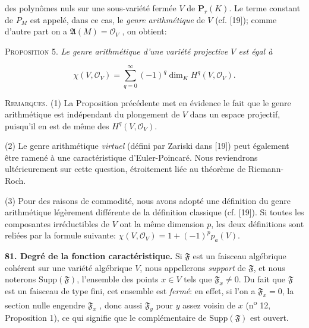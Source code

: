 %
%
%
des polynômes nuls sur une sous-variété fermée $V$ de $\mathbf{P}_r(K)$. Le terme constant de $P_M$ est appelé, dans ce cas, le \textit{genre arithmétique} de $V$ (cf. [19]); comme d'autre part on a $\mathfrak{A}(M) = \mathcal{O}_V$ , on obtient:

\textsc{Proposition} 5. \textit{Le genre arithmétique d'une variété projective $V$ est égal à}

\begin{equation*}
\chi(V, \mathcal{O}_V) = \sum_{q=0}^{\infty} (-1)^q \dim_K H^q(V, \mathcal{O}_V).
\end{equation*}

\textsc{Remarques}. (1) La Proposition précédente met en évidence le fait que le genre arithmétique est indépendant du plongement de $V$ dans un espace projectif, puisqu'il en est de même des $H^q(V, \mathcal{O}_V)$.

(2) Le genre arithmétique \textit{virtuel} (défini par Zariski dans [19]) peut également être ramené à une caractéristique d'Euler-Poincaré. Nous reviendrons ultérieurement sur cette question, étroitement liée au théorème de Riemann-Roch.

(3) Pour des raisons de commodité, nous avons adopté une définition du genre arithmétique légèrement différente de la définition classique (cf. [19]). Si toutes les composantes irréductibles de $V$ ont la même dimension $p$, les deux définitions sont reliées par la formule suivante: $\chi(V, \mathcal{O}_V) = 1 + (-1)^p p_a(V)$.

\textbf{81. Degré de la fonction caractéristique.} Si $\mathfrak{F}$ est un faisceau algébrique cohérent sur une variété algébrique $V$, nous appellerons \textit{support} de $\mathfrak{F}$, et nous noterons $\mathrm{Supp}(\mathfrak{F})$, l'ensemble des points $x \in V$ tels que $\mathfrak{F}_x \neq 0$. Du fait que $\mathfrak{F}$ est un faisceau de type fini, cet ensemble est \textit{fermé}: en effet, si l'on a $\mathfrak{F}_x = 0$, la section nulle engendre $\mathfrak{F}_x$ , donc aussi $\mathfrak{F}_y$ pour $y$ assez voisin de $x$ (n\textsuperscript{o} 12, Proposition 1), ce qui signifie que le complémentaire de $\mathrm{Supp}(\mathfrak{F})$ est ouvert.

